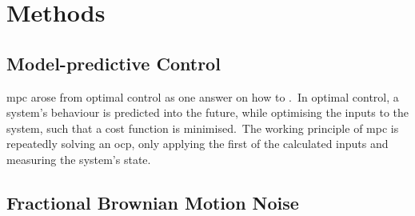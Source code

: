 \section{Methods}

\subsection{Model-predictive Control}
\ac{mpc} arose from optimal control as one answer on how to  \cite{rawlings2017mpc}.\ 
In optimal control, a system's behaviour is predicted into the future, while optimising the inputs to the system, such that a cost function is minimised.\
The working principle of \ac{mpc} is repeatedly solving an \ac{ocp}, only applying the first of the calculated inputs and measuring the system's state.\ 

\subsection{Fractional Brownian Motion Noise}